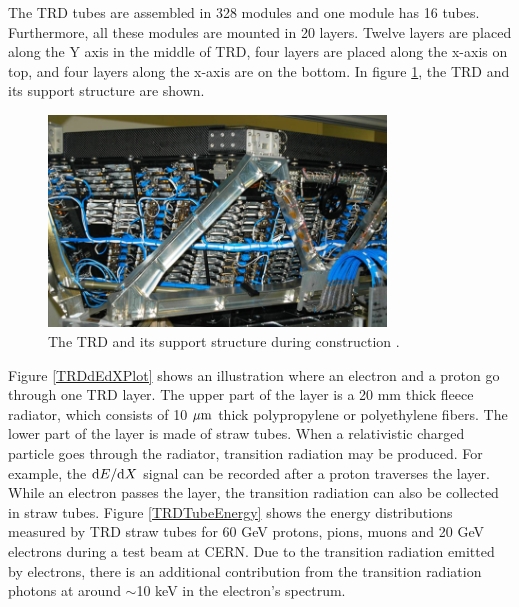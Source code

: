 The TRD tubes are assembled in 328 modules and one module has 16 tubes. Furthermore, all these modules are mounted in 20 layers. Twelve layers are placed along the Y axis in the middle of TRD, four layers are placed along the x-axis on top, and four layers along the x-axis are on the bottom. In figure \ref{TRDConstruction}, the TRD and its support structure are shown.  \par

\begin{figure}[t]
\centering
\includegraphics[width=0.8\textwidth, height=0.4\textheight ]{Figures/chapter3/TRD/TRDConstruction.png}
\caption[The TRD and its support structure during construction.]{The TRD and its support structure during construction \cite{AMSWebside}.}
\label{TRDConstruction}
\end{figure}

Figure \ref{TRDdEdXPlot} shows an illustration where an electron and a proton go through one TRD layer. The upper part of the layer is a 20 mm thick fleece radiator, which consists of 10 $\rm{\mu m}$ thick polypropylene or polyethylene fibers. The lower part of the layer is made of straw tubes. When a relativistic charged particle goes through the radiator, transition radiation may be produced. For example, the ${\rm{d}}E/{\rm{d}}X$ signal can be recorded after a proton traverses the layer. While an electron passes the layer, the transition radiation can also be collected in straw tubes. Figure \ref{TRDTubeEnergy} shows the energy distributions measured by TRD straw tubes for 60 GeV protons, pions, muons and 20 GeV electrons during a test beam at CERN. Due to the transition radiation emitted by electrons, there is an additional contribution from the transition radiation photons at around $\sim$10 keV in the electron's spectrum. \par

